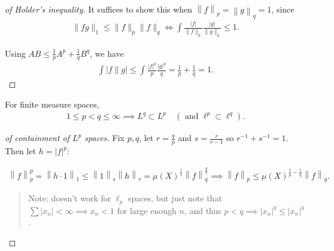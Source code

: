 \begin{proof}[of Holder's inequality]

It suffices to show this when
\({\left\lVert {f} \right\rVert}_p = {\left\lVert {g} \right\rVert}_q = 1\),
since
\begin{align*}  
\|f g\|_{1} \leq\|f\|_{p}\|f\|_{q} \Longleftrightarrow \int \frac{|f|}{\|f\|_{p}} \frac{|g|}{\|g\|_{q}} \leq 1
.\end{align*}

Using \(AB \leq \frac 1 p A^p + \frac 1 q B^q\), we have
\begin{align*}  
\int|f \| g| \leq \int \frac{|f|^{p}}{p} \frac{|g|^{q}}{q}=\frac{1}{p}+\frac{1}{q}=1
.\end{align*}

\end{proof}

\begin{example}

For finite measure spaces,
\begin{align*}
1 \leq p < q \leq \infty \implies L^q \subset L^p \quad (\text{ and } \ell^p \subset \ell^q)
.\end{align*}

\end{example}

\begin{proof}[of containment of $L^p$ spaces]

Fix \(p, q\), let \(r = \frac q p\) and \(s = \frac{r}{r-1}\) so
\(r^{-1}+ s^{-1}= 1\). Then let
\(h = {\left\lvert {f} \right\rvert}^p\):

\begin{align*}  
{\left\lVert {f} \right\rVert}_{p}^p 
= {\left\lVert {h\cdot 1} \right\rVert}_{1} \leq {\left\lVert {1} \right\rVert}_{s} {\left\lVert {h} \right\rVert}_{r} 
= \mu(X)^{\frac 1 s} {\left\lVert {f} \right\rVert}_{q}^{\frac q r}
\implies {\left\lVert {f} \right\rVert}_{p} 
\leq \mu(X)^{\frac 1 p - \frac 1 q} {\left\lVert {f} \right\rVert}_{q}
.\end{align*}

\begin{quote}
Note: doesn't work for \(\ell_p\) spaces, but just note that
\(\sum {\left\lvert {x_n} \right\rvert} < \infty \implies x_n < 1\) for
large enough \(n\), and thus
\(p<q \implies {\left\lvert {x_n} \right\rvert}^q \leq {\left\lvert {x_n} \right\rvert}^q\).
\end{quote}

\end{proof}


